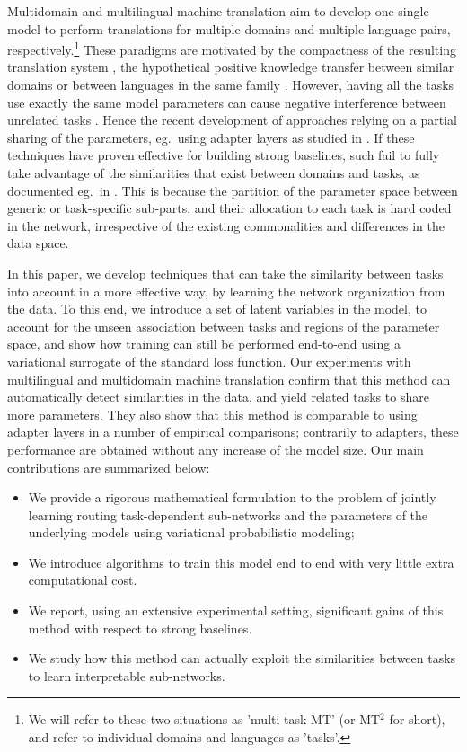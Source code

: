 \documentclass[11pt]{article}
\newcommand{\mtsquare}[0]{MT$^2$}
\begin{document}
Multidomain and multilingual machine translation aim to develop one single model to perform translations for multiple domains and multiple language pairs, respectively.\footnote{We will refer to these two situations as 'multi-task MT' (or \mtsquare{} for short), and refer to individual domains and languages as 'tasks'.} These paradigms are motivated by the compactness of the resulting translation system \citep{Chu18multilingual,dabre20survey}, the hypothetical positive knowledge transfer between similar domains \citep{Pham21revisiting} or between languages in the same family \citep{Tan19multilingual}. However, having all the tasks use exactly the same model parameters can cause negative interference between unrelated tasks \citep{conneau20unsupervised,wang20negative}. Hence the recent development of approaches relying on a partial sharing of the parameters, eg.\ using adapter layers as studied in \citep{houlsby19parameter,Bapna19simple,Pham20Study}. If these techniques have proven effective for building strong baselines, such fail to fully take advantage of the similarities that exist between domains and tasks, as documented eg.\ in \citet{Pham21revisiting}. This is because the partition of the parameter space between generic or task-specific sub-parts, and their allocation to each task is hard coded in the network, irrespective of the existing commonalities and differences in the data space.   

In this paper, we develop techniques that can take the similarity between tasks into account in a more effective way, by learning the network organization from the data. To this end, we introduce a set of latent variables in the model, to account for the unseen association between tasks and regions of the parameter space, and show how training can still be performed end-to-end using a variational surrogate of the standard loss function. Our experiments with multilingual and multidomain machine translation confirm that this method can automatically detect similarities in the data, and yield related tasks to share more parameters. They also show that this method is comparable to using adapter layers in a number of empirical comparisons; contrarily to adapters, these performance are obtained without any increase of the model size.  Our main contributions are summarized below:
\begin{itemize}
  \setlength{\itemsep}{1pt}
  \setlength{\parskip}{0pt}
  \setlength{\parsep}{0pt}
\item We provide a rigorous mathematical formulation to the problem of jointly learning routing task-dependent sub-networks and the parameters of the underlying models using variational probabilistic modeling;
\item We introduce algorithms to train this model end to end with very little extra computational cost.
\item We report, using an extensive experimental setting, significant gains of this method with respect to strong baselines.
\item We study how this method can actually exploit the similarities between tasks to learn interpretable sub-networks.
\end{itemize}
\end{document}
